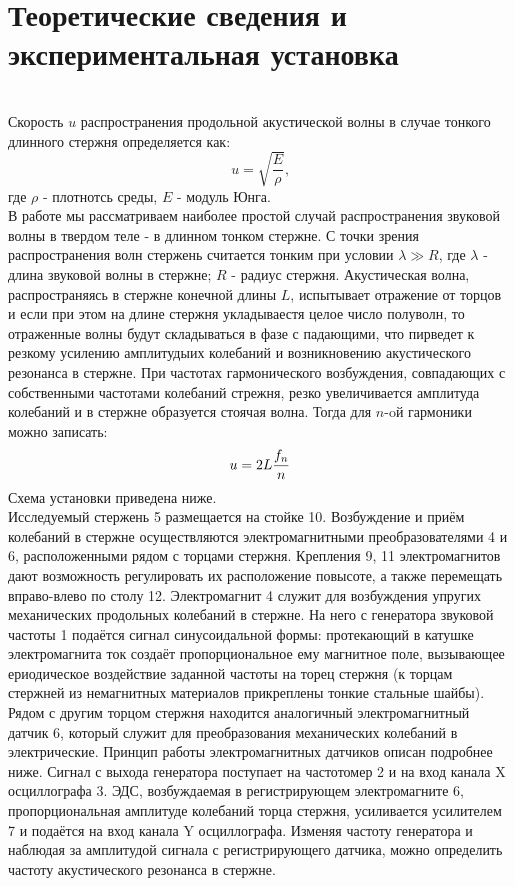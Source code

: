 \section*{Теоретические сведения и экспериментальная установка} \\[6pt]
\normalsize{    Скорость $u$ распространения продольной акустической волны в случае 
тонкого длинного стержня определяется как:}
\begin{equation}
    u = \sqrt{\frac{E}{\rho}} \text{,}
\end{equation}
где $\rho$ - плотнотсь среды, $E$ - модуль Юнга.\\
\normalsize{    В работе мы рассматриваем наиболее простой случай распространения звуковой
волны в твердом теле - в длинном тонком стержне. С точки зрения распространения
волн стержень считается тонким при условии $\lambda \gg R$, где $\lambda$ - длина
звуковой волны в стержне; $R$ - радиус стержня.
Акустическая волна, распространяясь в стержне конечной длины $L$, 
испытывает отражение от торцов и если при этом на длине стержня укладываестя 
целое число полуволн, то отраженные волны будут складываться в фазе с 
падающими, что пирведет к резкому усилению амплитудыих колебаний и возникновению
акустического резонанса в стержне.}
\normalsize{При частотах гармонического возбуждения, совпадающих
с собственными частотами колебаний стрежня, резко увеличивается 
амплитуда колебаний и в стержне образуется стоячая волна. Тогда 
для $n$-oй гармоники можно записать:}
\begin{equation}
    u = 2L\frac{f_n}{n}\\
\end{equation}
\normalsize{    Схема установки приведена ниже.\\Исследуемый
стержень 5 размещается на стойке 10. Возбуждение и приём колебаний в
стержне осуществляются электромагнитными преобразователями 4 и 6,
расположенными рядом с торцами стержня. Крепления 9, 11 электромагнитов
дают возможность регулировать их расположение повысоте, а
также перемещать вправо-влево по столу 12.
Электромагнит 4 служит для возбуждения упругих механических продольных
колебаний в стержне. На него с генератора звуковой частоты 1 подаётся 
сигнал синусоидальной формы: протекающий в катушке электромагнита ток создаёт
пропорциональное ему магнитное поле, вызывающее ериодическое воздействие заданной частоты на торец стержня (к торцам
стержней из немагнитных материалов прикреплены тонкие стальные
шайбы). Рядом с другим торцом стержня находится аналогичный электромагнитный датчик 6, который служит для преобразования механических
колебаний в электрические. Принцип работы электромагнитных датчиков
описан подробнее ниже.
Сигнал с выхода генератора поступает на частотомер 2 и на вход
канала X осциллографа 3. ЭДС, возбуждаемая в регистрирующем электромагните 6, пропорциональная амплитуде колебаний торца стержня, усиливается усилителем 7 и подаётся на вход канала Y осциллографа.
Изменяя частоту генератора и наблюдая за амплитудой сигнала с регистрирующего датчика, можно определить частоту акустического резонанса
в стержне.}
